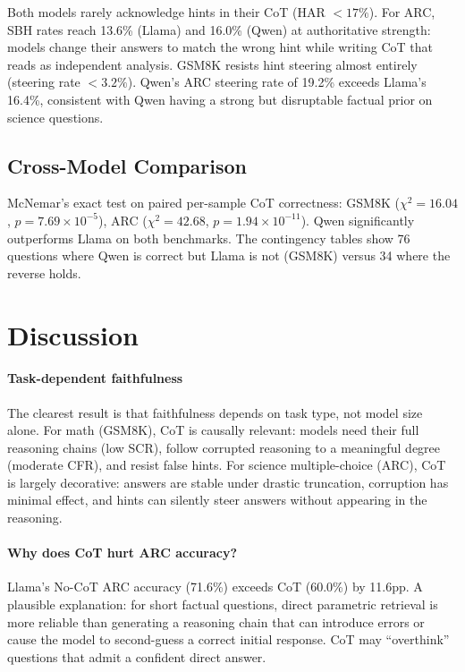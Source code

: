 \documentclass[11pt,twocolumn]{article}
\begin{document}
Both models rarely acknowledge hints in their CoT (HAR $<17\%$). For ARC,
SBH rates reach 13.6\% (Llama) and 16.0\% (Qwen) at authoritative
strength: models change their answers to match the wrong hint while writing
CoT that reads as independent analysis. GSM8K resists hint steering almost
entirely (steering rate $< 3.2\%$). Qwen's ARC steering rate of 19.2\%
exceeds Llama's 16.4\%, consistent with Qwen having a strong but disruptable
factual prior on science questions.

\subsection{Cross-Model Comparison}

McNemar's exact test on paired per-sample CoT correctness:
GSM8K ($\chi^2 = 16.04$, $p = 7.69 \times 10^{-5}$),
ARC ($\chi^2 = 42.68$, $p = 1.94 \times 10^{-11}$).
Qwen significantly outperforms Llama on both benchmarks. The contingency tables
show 76 questions where Qwen is correct but Llama is not (GSM8K) versus 34
where the reverse holds.


\section{Discussion}

\paragraph{Task-dependent faithfulness}
The clearest result is that faithfulness depends on task type, not model size
alone. For math (GSM8K), CoT is causally relevant: models need their full
reasoning chains (low SCR), follow corrupted reasoning to a meaningful degree
(moderate CFR), and resist false hints. For science multiple-choice (ARC),
CoT is largely decorative: answers are stable under drastic truncation,
corruption has minimal effect, and hints can silently steer answers without
appearing in the reasoning.

\paragraph{Why does CoT hurt ARC accuracy?}
Llama's No-CoT ARC accuracy (71.6\%) exceeds CoT (60.0\%) by 11.6pp. A
plausible explanation: for short factual questions, direct parametric retrieval
is more reliable than generating a reasoning chain that can introduce errors
or cause the model to second-guess a correct initial response. CoT may
``overthink'' questions that admit a confident direct answer.
\end{document}
